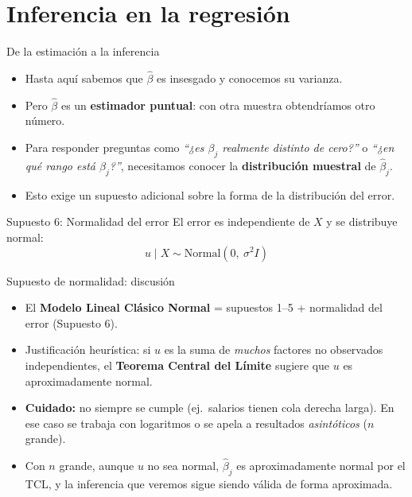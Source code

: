 \documentclass{beamer}
\begin{document}
\section{Inferencia en la regresión}

\begin{frame}{De la estimación a la inferencia}
\begin{itemize}
    \item Hasta aquí sabemos que $\hat{\beta}$ es insesgado y conocemos su varianza.
    \item Pero $\hat{\beta}$ es un \textbf{estimador puntual}: con otra muestra obtendríamos otro número.
    \pause
    \item Para responder preguntas como \emph{``¿es $\beta_j$ realmente distinto de cero?''} o \emph{``¿en qué rango está $\beta_j$?''}, necesitamos conocer la \textbf{distribución muestral} de $\hat{\beta}_j$.
    \pause
    \item Esto exige un supuesto adicional sobre la forma de la distribución del error.
\end{itemize}

\begin{block}{Supuesto 6: Normalidad del error}
El error es independiente de $X$ y se distribuye normal:
\[
u \mid X \sim \text{Normal}(0,\ \sigma^2 I)
\]
\end{block}
\end{frame}

\begin{frame}{Supuesto de normalidad: discusión}
\begin{itemize}
    \item El \textbf{Modelo Lineal Clásico Normal} = supuestos 1--5 + normalidad del error (Supuesto 6).
    \pause
    \item Justificación heurística: si $u$ es la suma de \emph{muchos} factores no observados independientes, el \textbf{Teorema Central del Límite} sugiere que $u$ es aproximadamente normal.
    \pause
    \item \textbf{Cuidado:} no siempre se cumple (ej.\ salarios tienen cola derecha larga). En ese caso se trabaja con logaritmos o se apela a resultados \emph{asintóticos} ($n$ grande).
    \pause
    \item Con $n$ grande, aunque $u$ no sea normal, $\hat{\beta}_j$ es aproximadamente normal por el TCL, y la inferencia que veremos sigue siendo válida de forma aproximada.
\end{itemize}
\end{frame}
\end{document}
